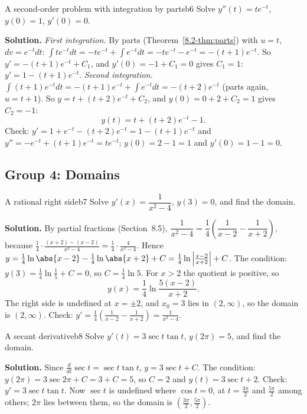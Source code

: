 \documentclass[11pt]{article}
\begin{document}
\begin{exmp}{A second-order problem with integration by parts}{b6}
Solve $y''(t)=te^{-t}$, $y(0)=1$, $y'(0)=0$.

\textbf{Solution.} \emph{First integration.} By parts (Theorem~\ref{8.2-thm:parts}) with $u=t$, $dv=e^{-t}dt$: $\int te^{-t}dt=-te^{-t}+\int e^{-t}dt=-te^{-t}-e^{-t}=-(t+1)e^{-t}$. So $y'=-(t+1)e^{-t}+C_1$, and $y'(0)=-1+C_1=0$ gives $C_1=1$: $y'=1-(t+1)e^{-t}$.
\emph{Second integration.} $\int(t+1)e^{-t}dt=-(t+1)e^{-t}+\int e^{-t}dt=-(t+2)e^{-t}$ (parts again, $u=t+1$). So $y=t+(t+2)e^{-t}+C_2$, and $y(0)=0+2+C_2=1$ gives $C_2=-1$:
\[
y(t)=t+(t+2)e^{-t}-1 .
\]
Check: $y'=1+e^{-t}-(t+2)e^{-t}=1-(t+1)e^{-t}$ and $y''=-e^{-t}+(t+1)e^{-t}=te^{-t}$; $y(0)=2-1=1$ and $y'(0)=1-1=0$.
\end{exmp}

\subsection*{Group 4: Domains}

\begin{exmp}{A rational right side}{b7}
Solve $y'(x)=\dfrac1{x^2-4}$, $y(3)=0$, and find the domain.

\textbf{Solution.} By partial fractions (Section~8.5), $\dfrac1{x^2-4}=\dfrac14\left(\dfrac1{x-2}-\dfrac1{x+2}\right)$, because $\frac14\cdot\frac{(x+2)-(x-2)}{x^2-4}=\frac14\cdot\frac4{x^2-4}$. Hence $y=\frac14\ln\abs{x-2}-\frac14\ln\abs{x+2}+C=\frac14\ln\left|\frac{x-2}{x+2}\right|+C$. The condition: $y(3)=\frac14\ln\frac15+C=0$, so $C=\frac14\ln5$. For $x>2$ the quotient is positive, so
\[
y(x)=\frac14\ln\frac{5(x-2)}{x+2} .
\]
The right side is undefined at $x=\pm2$, and $x_0=3$ lies in $(2,\infty)$, so the domain is $(2,\infty)$. Check: $y'=\frac14\left(\frac1{x-2}-\frac1{x+2}\right)=\frac1{x^2-4}$.
\end{exmp}

\begin{exmp}{A secant derivative}{b8}
Solve $y'(t)=3\sec t\tan t$, $y(2\pi)=5$, and find the domain.

\textbf{Solution.} Since $\frac d{dt}\sec t=\sec t\tan t$, $y=3\sec t+C$. The condition: $y(2\pi)=3\sec2\pi+C=3+C=5$, so $C=2$ and $y(t)=3\sec t+2$. Check: $y'=3\sec t\tan t$. Now $\sec t$ is undefined where $\cos t=0$, at $t=\frac{3\pi}2$ and $\frac{5\pi}2$ among others; $2\pi$ lies between them, so the domain is $\left(\frac{3\pi}2,\frac{5\pi}2\right)$.
\end{exmp}
\end{document}
